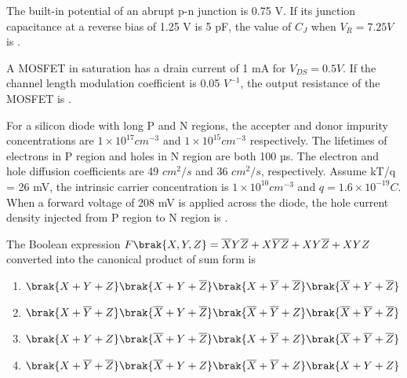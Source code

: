     \hfill{}

    \item The built-in potential of an abrupt p-n junction is 0.75 V. If its junction capacitance  at a reverse bias  of 1.25 V is 5 pF, the value of $C_{J}$  when $V_{R}=7.25 V$ is \underline{\hspace{2cm}}.
    
    \hfill{}

    \item A MOSFET in saturation has a drain current of 1 mA for $V_{DS}=0.5 V$. If the channel length modulation coefficient is 0.05 $V^{-1}$, the output resistance  of the MOSFET is \underline{\hspace{2cm}}.
    
    \hfill{}

    \item For a silicon diode with long P and N regions, the accepter and donor impurity concentrations are $1\times10^{17}cm^{-3}$ and $1\times10^{15}cm^{-3}$ respectively. The lifetimes of electrons in P region and holes in N region are both 100 µs. The electron and hole diffusion coefficients are 49 $cm^{2}/s$ and 36 $cm^{2}/s$, respectively. Assume kT/q = 26 mV, the intrinsic carrier concentration is $1\times10^{10}cm^{-3}$ and $q=1.6\times10^{-19}C$. When a forward voltage of 208 mV is applied across the diode, the hole current density  injected from P region to N region is \underline{\hspace{2cm}}.
    
    \hfill{}

    \item The Boolean expression $F\brak{X,Y,Z}=\overline{X}Y\overline{Z}+X\overline{Y}\overline{Z}+X Y\overline{Z}+XYZ$ converted into the canonical product of sum  form is
    \begin{enumerate}
        \item $\brak{X+Y+Z}\brak{X+Y+\overline{Z}}\brak{X+\overline{Y}+\overline{Z}}\brak{\overline{X}+Y+\overline{Z}}$
        \item $\brak{X+\overline{Y}+Z}\brak{\overline{X}+Y+\overline{Z}}\brak{\overline{X}+\overline{Y}+Z}\brak{\overline{X}+\overline{Y}+\overline{Z}}$
        \item $\brak{X+Y+Z}\brak{\overline{X}+Y+\overline{Z}}\brak{X+\overline{Y}+Z}\brak{\overline{X}+\overline{Y}+\overline{Z}}$
        \item $\brak{X+\overline{Y}+\overline{Z}}\brak{\overline{X}+Y+Z}\brak{\overline{X}+\overline{Y}+Z}\brak{X+Y+Z}$
    \end{enumerate}
    
